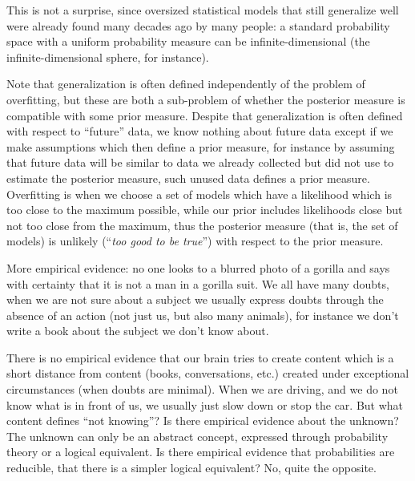 \documentclass[11pt]{book}
\begin{document}
This is not a surprise, since oversized statistical models that still
generalize well were already found many decades ago by many
people\cite{peterson_gaussian_2019}:
a standard probability space with a uniform probability measure can be
infinite-dimensional (the infinite-dimensional
sphere\cite{peterson_gaussian_2019},
for instance).

Note that generalization is often defined independently of the problem
of overfitting, but these are both a sub-problem of whether the
posterior measure is compatible with some prior measure. Despite that
generalization is often defined with respect to ``future'' data, we know
nothing about future data except if we make assumptions which then
define a prior measure, for instance by assuming that future data will
be similar to data we already collected but did not use to estimate the
posterior measure, such unused data defines a prior measure. Overfitting
is when we choose a set of models which have a likelihood which is too
close to the maximum possible, while our prior includes likelihoods
close but not too close from the maximum, thus the posterior measure
(that is, the set of models) is unlikely (``\emph{too good to be
true}'') with respect to the prior measure.

More empirical evidence: no one looks to a blurred photo of a gorilla
and says with certainty that it is not a man in a gorilla suit. We all
have many doubts, when we are not sure about a subject we usually
express doubts through the absence of an action (not just us, but also
many animals), for instance we don't write a book about the subject we
don't know about.

There is no empirical evidence that our brain tries to create content
which is a short distance from content (books, conversations, etc.)
created under exceptional circumstances (when doubts are minimal). When
we are driving, and we do not know what is in front of us, we usually
just slow down or stop the car. But what content defines ``not
knowing''? Is there empirical evidence about the unknown? The unknown
can only be an abstract concept, expressed through probability theory or
a logical equivalent. Is there empirical evidence that probabilities are
reducible, that there is a simpler logical equivalent? No, quite the
opposite.
\end{document}
